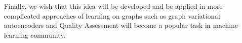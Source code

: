 \documentclass[12pt,twoside]{article}
\begin{document}
	Finally, we wish that this idea will be developed and be applied in more complicated approaches of learning on graphs such as
	graph variational autoencoders\cite{Kipf2016a} and Quality Assessment will become a popular task in machine learning community.
	
	
	
	
	
	
	
	
	
\end{document}
